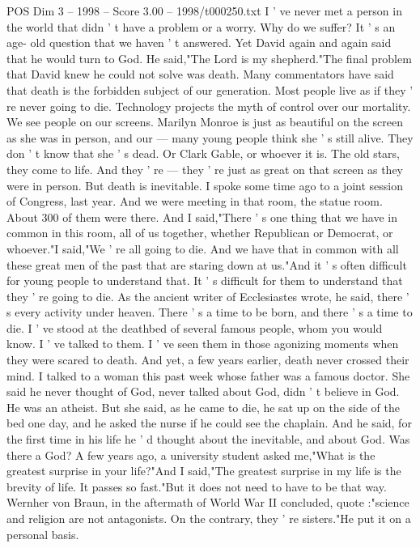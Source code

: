 \begin{textsample}{POS Dim 3 – 1998 – Score 3.00 – 1998/t000250.txt}
I ' ve never met a person in the world that didn ' t have a problem or a worry.
Why do we suffer?
It ' s an age- old question that we haven ' t answered.
Yet David again and again said that he would turn to God.
He said,"The Lord is my shepherd."The final problem that David knew he could not solve was death.
Many commentators have said that death is the forbidden subject of our generation.
Most people live as if they ' re never going to die.
Technology projects the myth of control over our mortality.
We see people on our screens.
Marilyn Monroe is just as beautiful on the screen as she was in person, and our — many young people think she ' s still alive.
They don ' t know that she ' s dead.
Or Clark Gable, or whoever it is.
The old stars, they come to life.
And they ' re — they ' re just as great on that screen as they were in person.
But death is inevitable.
I spoke some time ago to a joint session of Congress, last year.
And we were meeting in that room, the statue room.
About 300 of them were there.
And I said,"There ' s one thing that we have in common in this room, all of us together, whether Republican or Democrat, or whoever."I said,"We ' re all going to die.
And we have that in common with all these great men of the past that are staring down at us."And it ' s often difficult for young people to understand that.
It ' s difficult for them to understand that they ' re going to die.
As the ancient writer of Ecclesiastes wrote, he said, there ' s every activity under heaven.
There ' s a time to be born, and there ' s a time to die.
I ' ve stood at the deathbed of several famous people, whom you would know.
I ' ve talked to them.
I ' ve seen them in those agonizing moments when they were scared to death.
And yet, a few years earlier, death never crossed their mind.
I talked to a woman this past week whose father was a famous doctor.
She said he never thought of God, never talked about God, didn ' t believe in God.
He was an atheist.
But she said, as he came to die, he sat up on the side of the bed one day, and he asked the nurse if he could see the chaplain.
And he said, for the first time in his life he ' d thought about the inevitable, and about God.
Was there a God?
A few years ago, a university student asked me,"What is the greatest surprise in your life?"And I said,"The greatest surprise in my life is the brevity of life.
It passes so fast."But it does not need to have to be that way.
Wernher von Braun, in the aftermath of World War II concluded, quote :"science and religion are not antagonists.
On the contrary, they ' re sisters."He put it on a personal basis.

\end{textsample}
